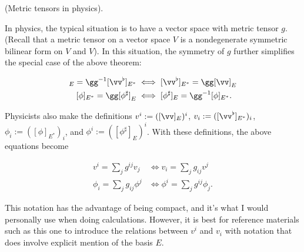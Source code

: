 \begin{remark}
    (Metric tensors in physics).
    
    In physics, the typical situation is to have a vector space with metric tensor $g$. (Recall that a metric tensor on a vector space $V$ is a nondegenerate symmetric bilinear form on $V$ and $V$). In this situation, the symmetry of $g$ further simplifies the special case of the above theorem:
    
    \begin{align*}
        [\vv]_E = \gg^{-1} [\vv^\flat]_{E^*} &\iff [\vv^\flat]_{E^*} = \gg [\vv]_E \\
        [\phi]_{E^*} = \gg [\phi^\sharp]_E &\iff [\phi^\sharp]_E = \gg^{-1} [\phi]_{E^*}.
    \end{align*}
    
    Physicists also make the definitions $v^i := ([\vv]_E)^i$, $v_i := ([\vv^\flat]_{E^*})_i$, $\phi_i := ([\phi]_{E^*})_i$, and $\phi^i := ([\phi^\sharp]_E)^i$. With these definitions, the above equations become
    
    \begin{align*}
        v^i = \sum_j g^{ij} v_j &\iff v_i = \sum_j g_{ij} v^j \\
        \phi_i = \sum_j g_{ij} \phi^j &\iff \phi^i = \sum_j g^{ij} \phi_j.
    \end{align*}
    
    This notation has the advantage of being compact, and it's what I would personally use when doing calculations. However, it is best for reference materials such as this one to introduce the relations between $v^i$ and $v_i$ with notation that does involve explicit mention of the basis $E$.
\end{remark}

